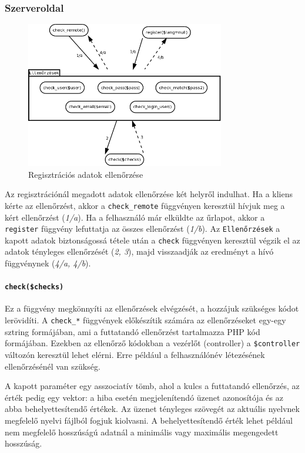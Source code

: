 \documentclass[12pt,a4paper,twoside]{article}
\begin{document}
\subsubsection{Szerveroldal}

\begin{figure}[htp]
  \centering
  \includegraphics[width=328px]{reg_check.png}
  \caption{Regisztrációs adatok ellenőrzése}\label{fig:reg_check}
\end{figure}


Az regisztrációnál megadott adatok ellenőrzése két helyről indulhat. Ha a kliens
kérte az ellenőrzést, akkor a \texttt{check\_remote} függvényen keresztül hívjuk
meg a kért ellenőrzést (\emph{1/a}). Ha a felhasználó már elküldte az űrlapot,
akkor a \texttt{register} függvény lefuttatja az összes ellenőrzést
(\emph{1/b}). Az \texttt{Ellenőrzések} a kapott adatok biztonságossá tétele után a
\texttt{check} függvényen keresztül végzik el az adatok tényleges ellenőrzését
(\emph{2, 3}), majd visszaadják az eredményt a hívó függvénynek (\emph{4/a, 4/b}).


\paragraph{\texttt{check(\$checks)}}
Ez a függvény megkönnyíti az ellenőrzések elvégzését, a hozzájuk szükséges kódot
lerövidíti. A \texttt{check\_*} függvények előkészítik számára az ellenőrzéseket
egy-egy sztring formájában, ami a futtatandó ellenőrzést tartalmazza PHP kód
formájában. Ezekben az ellenőrző kódokban a vezérlőt (controller) a
\texttt{\$controller} változón keresztül lehet elérni. Erre például a
felhasználónév létezésének ellenőrzésénél van szükség.

A kapott paraméter egy asszociatív tömb, ahol a kulcs a futtatandó ellenőrzés,
az érték pedig egy vektor: a hiba esetén megjelenítendó üzenet azonosítója és
az abba behelyettesítendő értékek. Az üzenet tényleges szövegét az aktuális
nyelvnek megfelelő nyelvi fájlból fogjuk kiolvasni. A behelyettesítendő érték
lehet például nem megfelelő hosszúságú adatnál a minimális vagy maximális
megengedett hosszúság.
\end{document}
